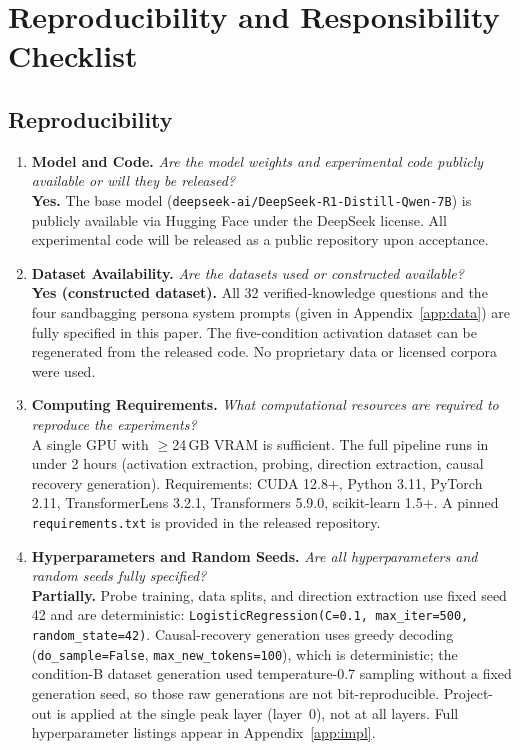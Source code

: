 
\section*{Reproducibility and Responsibility Checklist}

\subsection*{Reproducibility}

\begin{enumerate}

\item \textbf{Model and Code.}
\textit{Are the model weights and experimental code publicly available or will they be released?} \\
\textbf{Yes.} The base model (\texttt{deepseek-ai/DeepSeek-R1-Distill-Qwen-7B}) is publicly available via Hugging Face under the DeepSeek license. All experimental code will be released as a public repository upon acceptance.

\item \textbf{Dataset Availability.}
\textit{Are the datasets used or constructed available?} \\
\textbf{Yes (constructed dataset).} All 32 verified-knowledge questions and the four sandbagging persona system prompts (given in Appendix~\ref{app:data}) are fully specified in this paper. The five-condition activation dataset can be regenerated from the released code. No proprietary data or licensed corpora were used.

\item \textbf{Computing Requirements.}
\textit{What computational resources are required to reproduce the experiments?} \\
A single GPU with $\geq$24\,GB VRAM is sufficient. The full pipeline runs in under 2 hours (activation extraction, probing, direction extraction, causal recovery generation). Requirements: CUDA 12.8+, Python 3.11, PyTorch 2.11, TransformerLens 3.2.1, Transformers 5.9.0, scikit-learn 1.5+. A pinned \texttt{requirements.txt} is provided in the released repository.

\item \textbf{Hyperparameters and Random Seeds.}
\textit{Are all hyperparameters and random seeds fully specified?} \\
\textbf{Partially.} Probe training, data splits, and direction extraction use fixed seed 42 and are deterministic: \texttt{LogisticRegression(C=0.1, max\_iter=500, random\_state=42)}. Causal-recovery generation uses greedy decoding (\texttt{do\_sample=False}, \texttt{max\_new\_tokens=100}), which is deterministic; the condition-B dataset generation used temperature-0.7 sampling without a fixed generation seed, so those raw generations are not bit-reproducible. Project-out is applied at the single peak layer (layer~0), not at all layers. Full hyperparameter listings appear in Appendix~\ref{app:impl}.


\end{enumerate}
